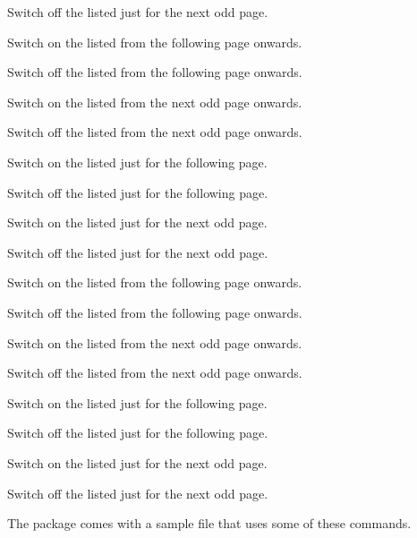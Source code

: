 \documentclass[fontsize=12pt]{scrbook}
\begin{document}
Switch off the listed  just for the next odd page.

Switch on the listed  from the following page onwards.

Switch off the listed  from the following page onwards.

Switch on the listed  from the next odd page onwards.

Switch off the listed  from the next odd page onwards.

Switch on the listed  just for the following page.

Switch off the listed  just for the following page.

Switch on the listed  just for the next odd page.

Switch off the listed  just for the next odd page.

Switch on the listed  from the following page onwards.

Switch off the listed  from the following page onwards.

Switch on the listed  from the next odd page onwards.

Switch off the listed  from the next odd page onwards.

Switch on the listed  just for the following page.

Switch off the listed  just for the following page.

Switch on the listed  just for the next odd page.

Switch off the listed  just for the next odd page.

The  package comes with a sample file
 that uses some of these commands.
\end{document}
